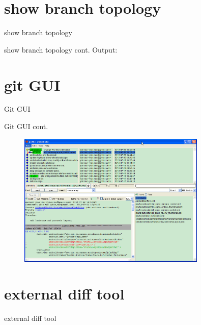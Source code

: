 ﻿\documentclass{beamer}
\begin{document}
\section[show branch topology]{show branch topology}
\begin{frame}{show branch topology}
\end{frame}

\begin{frame}{show branch topology cont.}
  \textcolor{blue!50}{\ttfamily Output:}
  
\end{frame}

\section[git GUI]{git GUI}
\begin{frame}{Git GUI}
\end{frame}

\begin{frame}{Git GUI cont.}
\begin{figure}
  \centering
  \includegraphics[width=0.8\textwidth]{gitk.png}%
\end{figure}
\end{frame}

\section[external diff tool]{external diff tool}
\begin{frame}{external diff tool}
\end{frame}
\end{document}
